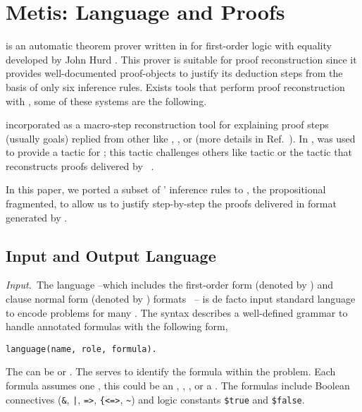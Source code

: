 \documentclass[../main.tex]{subfiles}
\begin{document}

\section{Metis: Language and Proofs}
\label{sec:metis-language-and-proofs}

\Metis is an automatic theorem prover written in 
for first-order logic with equality developed by John Hurd
\cite{hurd2003first}. This prover is suitable for proof
reconstruction since it provides well-documented proof-objects to
justify its deduction steps from the basis of only six inference
rules. Exists tools that perform proof reconstruction with \Metis,
some of these systems are the following.

 incorporated \Metis as a macro-step
reconstruction tool for explaining proof steps (usually \CNF goals)
replied from other \ATPs like , , or
 (more details in Ref.~\cite{paulson2007source}).
In \cite{Farber2015}, \Metis was used to provide a tactic for
; this tactic challenges others like 
tactic or the  tactic that reconstructs proofs
delivered by ~\cite{Farber2016}.

In this paper, we ported a subset of \Metis' inference rules to
\Agda, the propositional fragmented, to allow us to justify
step-by-step the proofs delivered in \TSTP format generated
by \Metis.


\subsection{Input and Output Language}
\label{ssec:input-and-output-language}

\textit{Input.}~The \TPTP language --which includes the first-order
form (denoted by ) and clause normal form (denoted by
) formats~\cite{sutcliffe2009} -- is de facto input
standard language to encode problems for many \ATPs. The \TPTP
syntax describes a well-defined grammar to handle annotated formulas
with the following form,

\begin{verbatim}
language(name, role, formula).
\end{verbatim}

The  can be  or . The 
serves to identify the formula within the problem. Each formula
assumes one , this could be an ,
, , or a .
The formulas include Boolean connectives (\verb!&!, \verb!|!,
\verb!=>!, \verb!{<=>!, \verb!~!) and logic constants \verb!$true!
and \verb!$false!.
\end{document}
